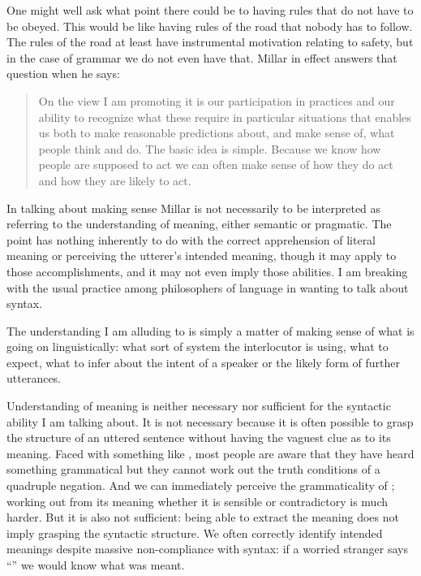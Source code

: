 \documentclass[output=paper]{langscibook}
\begin{document}
One might well ask what point there could be to having rules that do not have to be obeyed.  This would be like having rules of the road that nobody has to follow.  The rules of the road at least have instrumental motivation relating to safety, but in the case of grammar we do not even have that.  Millar in effect answers that question when he says:
\begin{quote} On the view I am promoting it is our participation in practices and our ability to recognize what these require in particular situations that enables us both to make reasonable predictions about, and make sense of, what people think and do. The basic idea is simple. Because we know how people are supposed to act we can often make sense of how they do act and how they are likely to act. \end{quote} In talking about making sense Millar is not necessarily to be interpreted as referring to the understanding of meaning, either semantic or pragmatic. The point has nothing inherently to do with the correct apprehension of literal meaning or perceiving the utterer's intended meaning, though it may apply to those accomplishments, and it may not even imply those abilities.  I am breaking with the usual practice among philosophers of language in wanting to talk about syntax.

The understanding I am alluding to is simply a matter of making sense of what is going on linguistically: what sort of system the interlocutor is using, what to expect, what to infer about the intent of a speaker or the likely form of further utterances.

Understanding of meaning is neither necessary nor sufficient for the syntactic ability I am talking about.  It is not necessary because it is often possible to grasp the structure of an uttered sentence without having the vaguest clue as to its meaning.  Faced with something like , most people are aware that they have heard something grammatical but they cannot work out the truth conditions of a quadruple negation.  And we can immediately perceive the grammaticality of ; working out from its meaning whether it is sensible or contradictory is much harder.  But it is also not sufficient: being able to extract the meaning does not imply grasping the syntactic structure.  We often correctly identify intended meanings despite massive non-compliance with syntax: if a worried stranger says ``'' we would know what was meant.
\end{document}
